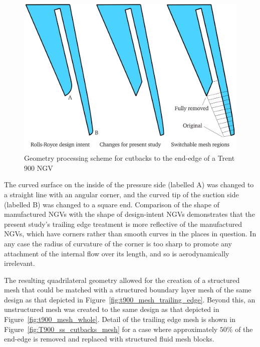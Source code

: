 \documentclass[a4paper, 11pt, oneside]{report}
\begin{document}
\begin{figure}[H]
      \centering
      \includegraphics[width=.9\textwidth]{figs/T900_ss_cutbacks_geometry.png}
      \caption{Geometry processing scheme for cutbacks to the end-edge of a Trent 900 NGV}
      \label{fig:T900_ss_cutbacks_geometry}
\end{figure}

The curved surface on the inside of the pressure side (labelled A) was changed to a straight line with an angular corner, and the curved tip of the suction side (labelled B) was changed to a square end. Comparison of the shape of manufactured NGVs with the shape of design-intent NGVs demonstrates that the present study's trailing edge treatment is more reflective of the manufactured NGVs, which have corners rather than smooth curves in the places in question. In any case the radius of curvature of the corner is too sharp to promote any attachment of the internal flow over its length, and so is aerodynamically irrelevant.

The resulting quadrilateral geometry allowed for the creation of a structured mesh that could be matched with a structured boundary layer mesh of the same design as that depicted in Figure~\ref{fig:t900_mesh_trailing_edge}. Beyond this, an unstructured mesh was created to the same design as that depicted in Figure~\ref{fig:t900_mesh_whole}. Detail of the trailing edge mesh is shown in Figure~\ref{fig:T900_ss_cutbacks_mesh} for a case where approximately $50\%$ of the end-edge is removed and replaced with structured fluid mesh blocks.
\end{document}
